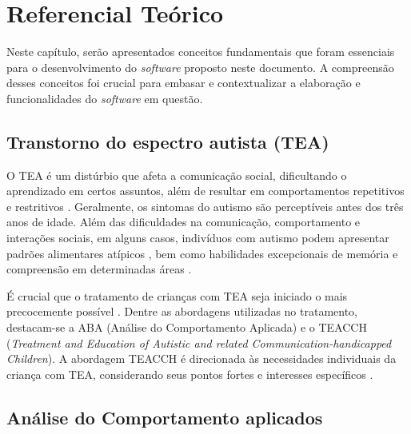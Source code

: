 \chapter{Referencial Teórico}\label{cap:referencial_teorico}

Neste capítulo, serão apresentados conceitos fundamentais que foram essenciais para o desenvolvimento do 
\textit{software} proposto neste documento. A compreensão desses conceitos foi crucial para embasar e 
contextualizar a elaboração e funcionalidades do \textit{software} em questão.

\section{Transtorno do espectro autista (TEA)}

O TEA é um distúrbio que afeta a comunicação social, 
dificultando o aprendizado em certos assuntos, 
além de resultar em comportamentos repetitivos e restritivos \cite{bordini2024exploring}. 
Geralmente, os sintomas do autismo são perceptíveis antes dos três anos de idade. 
Além das dificuldades na comunicação, comportamento e interações sociais, 
em alguns casos, indivíduos com autismo podem apresentar padrões alimentares atípicos \cite{london2007role}, 
bem como habilidades excepcionais de memória e compreensão em determinadas áreas \cite{treffert2009savant}.

É crucial que o tratamento de crianças com TEA seja iniciado o mais precocemente possível \cite{bosa2006autismo}. 
Dentre as abordagens utilizadas no tratamento, 
destacam-se a ABA (Análise do Comportamento Aplicada) e o TEACCH 
(\textit{Treatment and Education of Autistic and related Communication-handicapped Children}). 
A abordagem TEACCH é direcionada às necessidades individuais da criança com TEA, 
considerando seus pontos fortes e interesses específicos \cite{seiford2007perceived}.

\section{Análise do Comportamento aplicados}\label{otimizacao}

